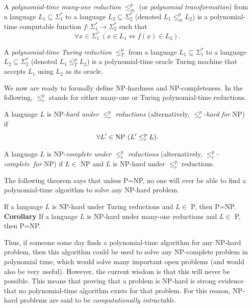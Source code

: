 \begin{definition}
{\rm A {\em polynomial-time many-one reduction\/} $\leq^p_m$ (or
{\em polynomial transformation\/}) from a language $L_1\subseteq\Sigma^*_1$
to a language $L_2\subseteq\Sigma^*_2$ (denoted $L_1\leq^p_m L_2$) is a
polynomial-time computable function $f:\Sigma^*_1\rightarrow\Sigma^*_2$ such
that
$$
  \forall x\in\Sigma^*_1\ (x\in L_1 \Longleftrightarrow f(x)\in L_2).
$$}
\end{definition}

\begin{definition}
{\rm A {\em polynomial-time Turing reduction\/} $\leq^p_T$ from a language
$L_1\subseteq\Sigma^*_1$ to a language $L_2\subseteq\Sigma^*_2$ (denoted
$L_1\leq^p_T L_2$) is a polynomial-time oracle Turing machine that accepts
$L_1$ using $L_2$ as its oracle.}
\end{definition}

We now are ready to formally define NP-hardness and NP-completeness.  In the
following, $\leq^p_r$ stands for either many-one or Turing polynomial-time
reductions.

\begin{definition}
{\rm A language $L$ is NP-{\em hard under $\leq^p_r$ reductions\/}
(alternatively, \mbox{$\leq^p_r$-{\em hard}} {\em for\/} NP) if
$$
  \forall L^\prime\in {\rm NP}\ (L^\prime\leq^p_r L).
$$}
\end{definition}

\begin{definition}
{\rm A language $L$ is NP-{\em complete under $\leq^p_r$ reductions\/}
(alternatively, \mbox{$\leq^p_r$-{\em complete for\/}} NP) if $L\in$ NP and
$L$ is NP-hard under $\leq^p_r$ reductions.}
\end{definition}

The following theorem says that unless P=NP, no one will ever be able to 
find a polynomial-time algorithm to solve any NP-hard problem.

\begin{theorem}
If a language $L$ is\/ {\rm NP}-hard under Turing reductions and $L\in$
{\rm P}, then\/ {\rm P=NP}.\\[1pc]
{\rm\bf Corollary} If a language $L$ is\/ {\rm NP}-hard under many-one
reductions and $L\in$ {\rm P}, then\/ {\rm P=NP}.
\end{theorem}

Thus, if someone some day finds a polynomial-time algorithm
for any NP-hard problem, then this algorithm could be used to solve any
NP-complete problem in polynomial time, which would solve many important
open problems (and would also be very useful).  However, the current
wisdom is that this will never be possible.  This means that proving that a
problem is NP-hard is strong evidence that no polynomial-time algorithm
exists for that problem.  For this reason, NP-hard problems are said to be
{\em computationally intractable}.

